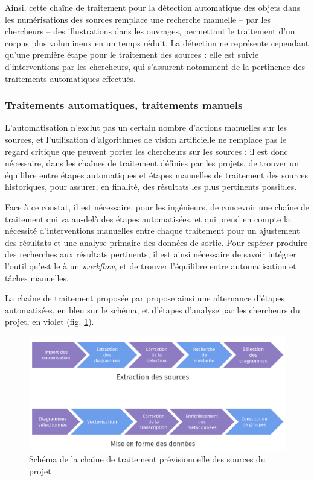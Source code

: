 	Ainsi, cette chaîne de traitement pour la détection automatique des objets dans les numérisations des sources remplace une recherche manuelle -- par les chercheurs -- des illustrations dans les ouvrages, permettant le traitement d'un corpus plus volumineux en un temps réduit. La détection ne représente cependant qu'une première étape pour le traitement des sources : elle est suivie d'interventions par les chercheurs, qui s'assurent notamment de la pertinence des traitements automatiques effectués.

    \subsubsection{Traitements automatiques, traitements manuels}
   	L'automatisation n'exclut pas un certain nombre d'actions manuelles sur les sources, et l'utilisation d'algorithmes de vision artificielle ne remplace pas le regard critique que peuvent porter les chercheurs sur les sources : il est donc nécessaire, dans les chaînes de traitement définies par les projets, de trouver un équilibre entre étapes automatiques et étapes manuelles de traitement des sources historiques, pour assurer, en finalité, des résultats les plus pertinents possibles.
   	
    Face à ce constat, il est nécessaire, pour les ingénieurs, de concevoir une chaîne de traitement qui va au-delà des étapes automatisées, et qui prend en compte la nécessité d'interventions manuelles entre chaque traitement pour un ajustement des résultats et une analyse primaire des données de sortie. Pour espérer produire des recherches aux résultats pertinents, il est ainsi nécessaire de savoir intégrer l'outil qu'est le \dl à un \textit{workflow}, et de trouver l'équilibre entre automatisation et tâches manuelles.
	
	La chaîne de traitement proposée par \eida propose ainsi une alternance d'étapes automatisées, en bleu sur le schéma, et d'étapes d'analyse par les chercheurs du projet, en violet (fig. \ref{fig:eida_workflow}).
    
    \begin{figure}[h]
    	\centering
    	\includegraphics[width=16cm]{images/eida_workflow.png}
    	\caption{Schéma de la chaîne de traitement prévisionnelle des sources du projet \eida}
    	\label{fig:eida_workflow}
    \end{figure}

